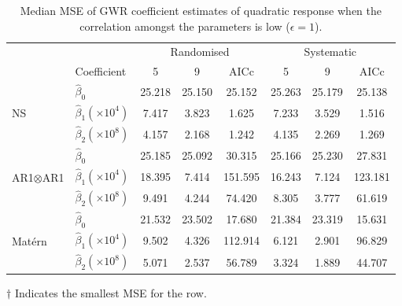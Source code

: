 \documentclass[a4paper]{article} 	%
\newcommand{\Matern}{Mat\'ern }
\begin{document}
\begin{table}[!htp]
	\centering
\begin{threeparttable}
	\caption{Median MSE of GWR coefficient estimates of quadratic response when the correlation amongst the parameters is low ($\epsilon=1$).}\label{tb:MSEquadratic}
	\begin{tabular}{llcccccc} \toprule
		 &  & \multicolumn{3}{c}{Randomised} & \multicolumn{3}{c}{Systematic} \\ 
		  & Coefficient & 5  & 9  & AICc & 5  & 9  & AICc \\ \midrule
		\multirow{3}{*}{NS}   & $\hat{\beta}_0$ & 25.218 & 25.150 & 25.152  & 25.263 & 25.179 & 25.138\tnote{$\dagger$}  \\
		& $\hat{\beta}_1 (\times 10^4)$ & 7.417  & 3.823  & 1.625 & 7.233  & 3.529  & 1.516\tnote{$\dagger$}  \\
		& $\hat{\beta}_2 (\times 10^8)$  & 4.157  & 2.168  & 1.242\tnote{$\dagger$} & 4.135  & 2.269  & 1.269   \\ \midrule 
		\multirow{3}{*}{AR1$\otimes$AR1}  & $\hat{\beta}_0$  & 25.185 & 25.092\tnote{$\dagger$} & 30.315  & 25.166 & 25.230 & 27.831  \\
		&$\hat{\beta}_1 (\times 10^4)$  & 18.395 & 7.414  & 151.595 & 16.243 & 7.124\tnote{$\dagger$}  & 123.181  \\
		& $\hat{\beta}_2 (\times 10^8)$ & 9.491  & 4.244  & 74.420  & 8.305  & 3.777\tnote{$\dagger$}  & 61.619 \\ \midrule
		\multirow{3}{*}{\Matern} & $\hat{\beta}_0$  & 21.532 & 23.502 & 17.680  & 21.384 & 23.319 & 15.631\tnote{$\dagger$} \\
		&$\hat{\beta}_1 (\times 10^4)$  & 9.502  & 4.326  & 112.914 & 6.121  & 2.901\tnote{$\dagger$}  & 96.829  \\
		& $\hat{\beta}_2 (\times 10^8)$  & 5.071  & 2.537  & 56.789  & 3.324  & 1.889\tnote{$\dagger$}  & 44.707 \\ \bottomrule
	\end{tabular}
	    \begin{tablenotes}
	        \item[$\dagger$] \footnotesize Indicates the smallest MSE for the row.
	    \end{tablenotes}
\end{threeparttable}
\end{table}
\end{document}
